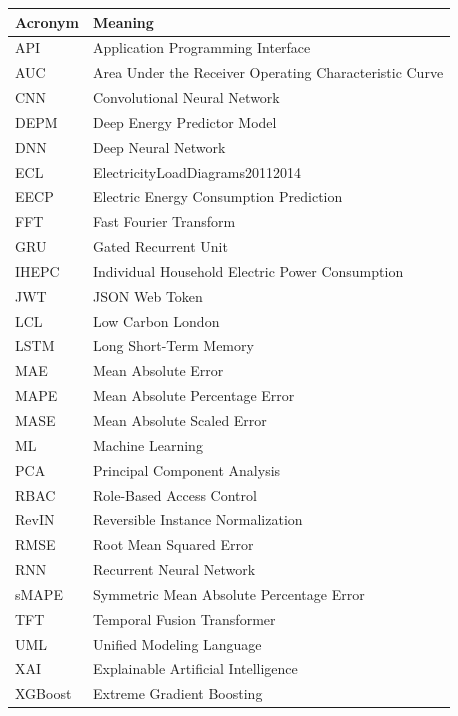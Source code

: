 \begin{longtable}{p{}p{}}
\toprule
\textbf{Acronym} & \textbf{Meaning} \\
\midrule
\endhead
API & Application Programming Interface \\
AUC & Area Under the Receiver Operating Characteristic Curve \\
CNN & Convolutional Neural Network \\
DEPM & Deep Energy Predictor Model \\
DNN & Deep Neural Network \\
ECL & ElectricityLoadDiagrams20112014 \\
EECP & Electric Energy Consumption Prediction \\
FFT & Fast Fourier Transform \\
GRU & Gated Recurrent Unit \\
IHEPC & Individual Household Electric Power Consumption \\
JWT & JSON Web Token \\
LCL & Low Carbon London \\
LSTM & Long Short-Term Memory \\
MAE & Mean Absolute Error \\
MAPE & Mean Absolute Percentage Error \\
MASE & Mean Absolute Scaled Error \\
ML & Machine Learning \\
PCA & Principal Component Analysis \\
RBAC & Role-Based Access Control \\
RevIN & Reversible Instance Normalization \\
RMSE & Root Mean Squared Error \\
RNN & Recurrent Neural Network \\
sMAPE & Symmetric Mean Absolute Percentage Error \\
TFT & Temporal Fusion Transformer \\
UML & Unified Modeling Language \\
XAI & Explainable Artificial Intelligence \\
XGBoost & Extreme Gradient Boosting \\
\bottomrule
\end{longtable}
